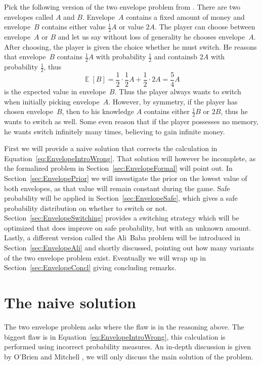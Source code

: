 \documentclass[a4paper]{report}
\theoremstyle{plain}
\theoremstyle{definition}
\theoremstyle{remark}
\numberwithin{equation}{chapter}
\DeclareMathOperator{\E}{\mathbb{E}}
\DeclareMathOperator{\1}{\mathbbm{1}}
\begin{document}
Pick the following version of the two envelope problem from \cite{Nalebuff89}. There are two envelopes called $A$ and $B$. Envelope~$A$ contains a fixed amount of money and envelope~$B$ contains either value $\frac{1}{2}A$ or value $2A$. The player can choose between envelope~$A$ or $B$ and let us say without loss of generality he chooses envelope~$A$. After choosing, the player is given the choice whether he must switch. He reasons that envelope~$B$ contains $\frac{1}{2}A$ with probability $\frac{1}{2}$ and containsb $2A$ with probability $\frac{1}{2}$, thus
\begin{equation}\label{eq:EnvelopeIntroWrong}
\E[B]=\frac{1}{2}\cdot\frac{1}{2}A+\frac{1}{2}\cdot2A=\frac{5}{4}A
\end{equation}
is the expected value in envelope~$B$. Thus the player always wants to switch when initially picking envelope~$A$. However, by symmetry, if the player has chosen envelope~$B$, then to his knowledge $A$ contains either $\frac{1}{2}B$ or $2B$, thus he wants to switch as well. Some even reason that if the player possesses no memory, he wants switch infinitely many times, believing to gain infinite money.

First we will provide a naive solution that corrects the calculation in Equation~\ref{eq:EnvelopeIntroWrong}. That solution will however be incomplete, as the formalized problem in Section~\ref{sec:EnvelopeFormal} will point out. In Section~\ref{sec:EnvelopePrior} we will investigate the prior on the lowest value of both envelopes, as that value will remain constant during the game. Safe probability will be applied in Section~\ref{sec:EnvelopeSafe}, which gives a safe probability distribution on whether to switch or not. Section~\ref{sec:EnvelopeSwitching} provides a switching strategy which will be optimized that does improve on safe probability, but with an unknown amount. Lastly, a different version called the Ali~Baba problem will be introduced in Section~\ref{sec:EnvelopeAli} and shortly discussed, pointing out how many variants of the two envelope problem exist. Eventually we will wrap up in Section~\ref{sec:EnvelopeConcl} giving concluding remarks.

\section{The naive solution}\label{sec:EnvelopeNaive}
The two envelope problem asks where the flaw is in the reasoning above. The biggest flaw is in Equation~\ref{eq:EnvelopeIntroWrong}, this calculation is performed using incorrect probability measures. An in-depth discussion is given by O'Brien and Mitchell \cite{Brien14}, we will only discuss the main solution of the problem.
\end{document}
